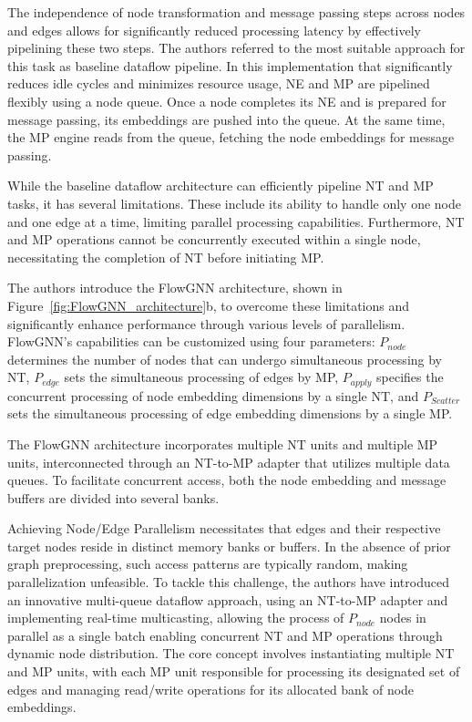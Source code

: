 The independence of node transformation and message passing steps across nodes and edges allows for significantly reduced processing latency by effectively pipelining these two steps.
The authors referred to the most suitable approach for this task as baseline dataflow pipeline.
In this implementation that significantly reduces idle cycles and minimizes resource usage, NE and MP are pipelined flexibly using a node queue.
Once a node completes its NE and is prepared for message passing, its embeddings are pushed into the queue.
At the same time, the MP engine reads from the queue, fetching the node embeddings for message passing.

While the baseline dataflow architecture can efficiently pipeline NT and MP tasks, it has several limitations.
These include its ability to handle only one node and one edge at a time, limiting parallel processing capabilities.
Furthermore, NT and MP operations cannot be concurrently executed within a single node, necessitating the completion of NT before initiating MP\@.

The authors introduce the FlowGNN architecture, shown in Figure~\ref{fig:FlowGNN_architecture}b, to overcome these limitations and significantly enhance performance through various levels of parallelism.
FlowGNN's capabilities can be customized using four parameters: $P_{node}$ determines the number of nodes that can undergo simultaneous processing by NT, $P_{edge}$ sets the simultaneous processing of edges by MP, $P_{apply}$ specifies the concurrent processing of node embedding dimensions by a single NT, and $P_{Scatter}$ sets the simultaneous processing of edge embedding dimensions by a single MP\@.

The FlowGNN architecture incorporates multiple NT units and multiple MP units, interconnected through an NT-to-MP adapter that utilizes multiple data queues.
To facilitate concurrent access, both the node embedding and message buffers are divided into several banks.

Achieving Node/Edge Parallelism necessitates that edges and their respective target nodes reside in distinct memory banks or buffers.
In the absence of prior graph preprocessing, such access patterns are typically random, making parallelization unfeasible.
To tackle this challenge, the authors have introduced an innovative multi-queue dataflow approach, using an NT-to-MP adapter and implementing real-time multicasting, allowing the process of $P_{node}$ nodes in parallel as a single batch enabling concurrent NT and MP operations through dynamic node distribution.
The core concept involves instantiating multiple NT and MP units, with each MP unit responsible for processing its designated set of edges and managing read/write operations for its allocated bank of node embeddings.

